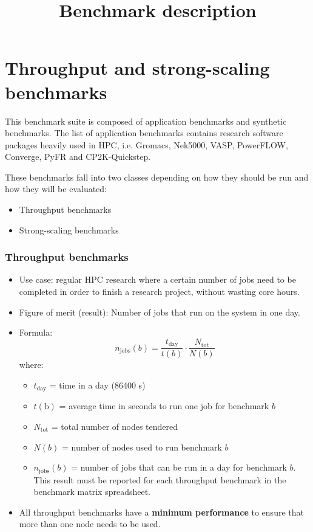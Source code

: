 \documentclass{article}
\begin{document}
\title{Benchmark description}

\maketitle

\section*{Throughput and strong-scaling benchmarks}

This benchmark suite is composed of application benchmarks and
synthetic benchmarks. The list of application benchmarks contains
research software packages heavily used in HPC, i.e. Gromacs, 
Nek5000, VASP, PowerFLOW, Converge, PyFR and CP2K-Quickstep.

These benchmarks fall into two classes depending on how they 
should be run and how they will be evaluated:
\begin{itemize}
\item Throughput benchmarks
\item Strong-scaling benchmarks
\end{itemize}

\subsubsection*{Throughput benchmarks}

\begin{itemize}
    \item Use case: regular HPC research where a certain number of jobs need to be completed in order to finish a research project, without wasting core hours. 
    \item Figure of merit (result): Number of jobs that run on the system in one day.
    \item Formula:
    \begin{equation}
        n_{\textrm{jobs}}(b) = \frac{t_{\textrm{day}}}{t(b)} \cdot \frac{N_{\textrm{tot}}}{N(b)}       
    \end{equation}
    where:
    \begin{itemize}
        \item $t_{\textrm{day}}$ = time in a day (86400 s)
        \item $t(\textrm{b})$ = average time in seconds to run one job for benchmark $b$
        \item $N_{\textrm{tot}}$ = total number of nodes tendered
        \item $N(b)$ = number of nodes used to run benchmark $b$
        \item $n_{\textrm{jobs}}(b)$ = number of jobs that can be run in a day for benchmark $b$. This result must be reported for each throughput benchmark in the benchmark matrix spreadsheet.
    \end{itemize}
    \item All throughput benchmarks have a \textbf{minimum performance} to ensure that more than one node needs to be used.

\end{itemize}
\end{document}
